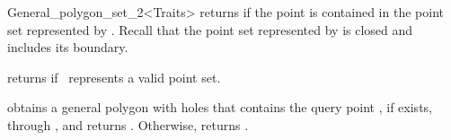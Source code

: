 \begin{ccRefClass}{General_polygon_set_2<Traits>}
  {returns  if the point  is contained in the point set
   represented by \ccVar. Recall that the point set represented by 
   is closed and includes its boundary.}

  {returns  if \ccVar\ represents a valid point set.}

% 
  {obtains a general polygon with holes that contains the query point
  , if exists, through , and returns
  . Otherwise, returns .}

\ccSeeAlso
  \\
  \\

\end{ccRefClass}

\ccRefPageEnd
